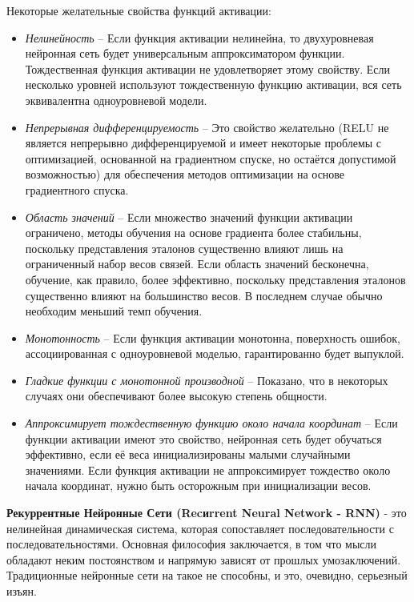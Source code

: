 \documentclass[a4paper,russian]{article}
\begin{document}
	\clearpage
	
	Некоторые желательные свойства функций активации:
	
	\begin{itemize}
		\item \textit{Нелинейность} – Если функция активации нелинейна, то двухуровневая нейронная сеть будет универсальным аппроксиматором функции. Тождественная функция активации не удовлетворяет этому свойству. Если несколько уровней используют тождественную функцию активации, вся сеть эквивалентна одноуровневой модели.
		
		\item \textit{Непрерывная дифференцируемость} – Это свойство желательно (RELU не является непрерывно дифференцируемой и имеет некоторые проблемы с оптимизацией, основанной на градиентном спуске, но остаётся допустимой возможностью) для обеспечения методов оптимизации на основе градиентного спуска.
		
		\item \textit{Область значений} – Если множество значений функции активации ограничено, методы обучения на основе градиента более стабильны, поскольку представления эталонов существенно влияют лишь на ограниченный набор весов связей. Если область значений бесконечна, обучение, как правило, более эффективно, поскольку представления эталонов существенно влияют на большинство весов. В последнем случае обычно необходим меньший темп обучения.
		
		\item \textit{Монотонность} – Если функция активации монотонна, поверхность ошибок, ассоциированная с одноуровневой моделью, гарантированно будет выпуклой.
		
		\item \textit{Гладкие функции с монотонной производной} – Показано, что в некоторых случаях они обеспечивают более высокую степень общности.
		 
		\item \textit{Аппроксимирует тождественную функцию около начала координат} – Если функции активации имеют это свойство, нейронная сеть будет обучаться эффективно, если её веса инициализированы малыми случайными значениями. Если функция активации не аппроксимирует тождество около начала координат, нужно быть осторожным при инициализации весов.
	\end{itemize}
	
	\textbf{Рекуррентные Нейронные Сети (Recиrrent Neural Network - RNN)} - это нелинейная динамическая система, которая сопоставляет последовательности с последовательностями. Основная философия заключается, в том что мысли обладают неким постоянством и напрямую зависят от прошлых умозаключений. Традиционные нейронные сети на такое не способны, и это, очевидно, серьезный изъян. 
	
\end{document}

